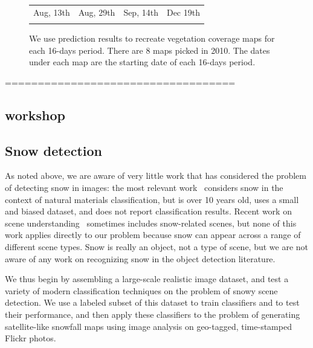\begin{figure}
\begin{center}
\begin{tabular}{cccc}
Aug, 13th&Aug, 29th&Sep, 14th&Dec 19th\\
\\
\end{tabular}
\end{center}
\vspace{-24pt}
\caption{%
We use prediction results to recreate vegetation coverage maps for each 16-days period. There are 8 maps picked in 2010. The dates under each map are the starting date of each 16-days period.}
\label{fig:map}
\vspace{-12pt}
\end{figure}

\hfill \break
\hfill \break
===================================
\hfill \break
\hfill \break
\subsection*{workshop}
\subsection{Snow detection}


As noted above, we are aware of very little work that has considered
the problem of detecting snow in images: the most relevant
work~\cite{singhal2003spatialcontext} considers snow in the context of
natural materials classification, but is over 10 years old, uses a
small and biased dataset, and does not report classification results.
Recent work on scene understanding~\cite{XiaoHEOT10} sometimes
includes snow-related scenes, but none of this work applies directly
to our problem because snow can appear across a range of different
scene types. Snow is really an object, not a type of scene, but we are
not aware of any work on recognizing snow in the object detection
literature.

We thus begin by assembling a large-scale realistic image dataset,
and test a variety of modern classification techniques on the
problem of snowy scene detection. We use a labeled subset of this
dataset to train classifiers and to test their performance, and then
apply these classifiers to the problem of generating satellite-like
snowfall maps using image analysis on geo-tagged, time-stamped
Flickr photos.





